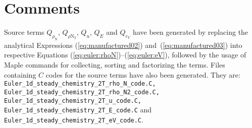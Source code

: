\documentclass[10pt]{article}
\begin{document}
\section{Comments}


Source terms $Q_{\rho_\text{N} }$, $Q_{\rho \text{N}_{2}}$, $Q_u$, $Q_E$ and $Q_{e_V}$ have been generated by replacing the analytical Expressions (\ref{eq:manufactured02}) and~(\ref{eq:manufactured03}) into respective Equations (\ref{eq:euler:rhoN})--(\ref{eq:euler:eV}), followed by the usage of Maple commands for collecting, sorting and factorizing the terms. Files containing $C$ codes for the source terms have also been generated. They are: \texttt{ Euler\_1d\_steady\_chemistry\_2T\_rho\_N\_code.C, Euler\_1d\_steady\_chemistry\_2T\_rho\_N2\_code.C,\\ Euler\_1d\_steady\_chemistry\_2T\_u\_code.C, Euler\_1d\_steady\_chemistry\_2T\_E\_code.C} and \\
\texttt{Euler\_1d\_steady\_chemistry\_2T\_eV\_code.C}.
\end{document}
